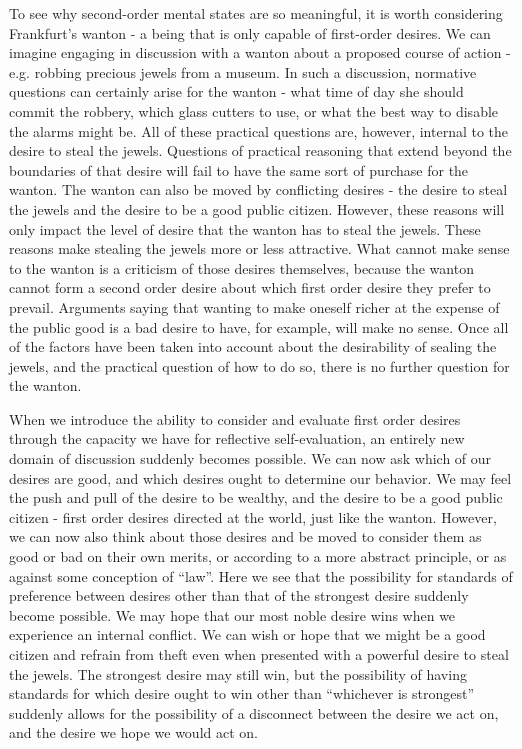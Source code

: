 \documentclass[phd,12pt,oneside,paper=letterpaper]{ubcthesis}
\begin{document}
To see why second-order mental states are so meaningful, it is worth considering Frankfurt's wanton - a being that is only capable of first-order desires.  We can imagine engaging in discussion with a wanton about a proposed course of action - e.g. robbing precious jewels from a museum. In such a discussion, normative questions can certainly arise for the wanton - what time of day she should commit the robbery, which glass cutters to use, or what the best way to disable the alarms might be. All of these practical questions are, however, internal to the desire to steal the jewels. Questions of practical reasoning that extend beyond the boundaries of that desire will fail to have the same sort of purchase for the wanton. The wanton can also be moved by conflicting desires - the desire to steal the jewels and the desire to be a good public citizen. However, these reasons will only impact the level of desire that the wanton has to steal the jewels. These reasons make stealing the jewels more or less attractive. What cannot make sense to the wanton is a criticism of those desires themselves, because the wanton cannot form a second order desire about which first order desire they prefer to prevail. Arguments saying that wanting to make oneself richer at the expense of the public good is a bad desire to have, for example, will make no sense. Once all of the factors have been taken into account about the desirability of sealing the jewels, and the practical question of how to do so, there is no further question for the wanton. 

When we introduce the ability to consider and evaluate first order desires through the capacity we have for reflective self-evaluation, an entirely new domain of discussion suddenly becomes possible. We can now ask which of our desires are good, and which desires ought to determine our behavior. We may feel the push and pull of the desire to be wealthy, and the desire to be a good public citizen - first order desires directed at the world, just like the wanton. However, we can now also think about those desires and be moved to consider them as good or bad on their own merits, or according to a more abstract principle, or as against some conception of ``law''. Here we see that the possibility for standards of preference between desires other than that of the strongest desire suddenly become possible. We may hope that our most noble desire wins when we experience an internal conflict. We can wish or hope that we might be a good citizen and refrain from theft even when presented with a powerful desire to steal the jewels. The strongest desire may still win, but the possibility of having standards for which desire ought to win other than ``whichever is strongest'' suddenly allows for the possibility of a disconnect between the desire we act on, and the desire we hope we would act on. 
\end{document}
